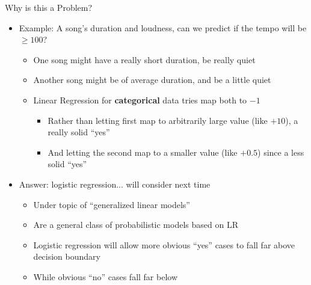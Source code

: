 \documentclass[aspectratio=169]{beamer}
\begin{document}
%
\begin{frame}{Why is this a Problem?}
\begin{itemize}
\item Example: A song's duration and loudness, can we predict if the tempo will be $\ge 100$?
	\begin{itemize}
	\item One song might have a really short duration, be really quiet
	\item Another song might be of average duration, and be a little quiet
	\item Linear Regression for \textbf{categorical} data tries map both to $-1$
	\begin{itemize}
	\item Rather than letting first map to arbitrarily large value (like $+10$), a really solid ``yes''
	\item And letting the second map to a smaller value (like $+0.5$) since a less solid ``yes''
	\end{itemize}
	\end{itemize}
\item Answer: logistic regression... will consider next time
	\begin{itemize}
	\item Under topic of ``generalized linear models''
	\item Are a general class of probabilistic models based on LR
	\item Logistic regression will allow more obvious ``yes'' cases to fall far above decision boundary
	\item While obvious ``no'' cases fall far below
	\end{itemize}
\end{itemize}
\end{frame}
\end{document}
